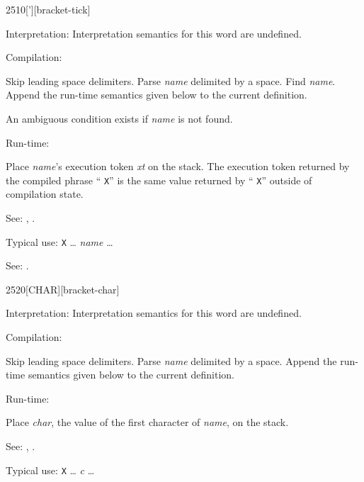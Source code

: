 \begin{newword*}{2510}{[']}[bracket-tick]
\item[Interpretation:]
	Interpretation semantics for this word are undefined.

\item[Compilation:]

	Skip leading space delimiters. Parse \emph{name} delimited by
	a space. Find \emph{name}. Append the run-time semantics given
	below to the current definition.

	An ambiguous condition exists if \emph{name} is not found.

\item[Run-time:]

	Place \emph{name}'s execution token \emph{xt} on the stack. The
	execution token returned by the compiled phrase
	``\word{[']} \texttt{X}'' is the same value returned by
	`` \texttt{X}'' outside of compilation state.

\item[See:]
	,
	.

	\begin{rationale} %
		Typical use:
			\word{:} \texttt{X} {\ldots}
				\word{[']} \emph{name}
			{\ldots} \word{;}

		See:
			.
	\end{rationale}
\end{newword*}


\begin{newword*}{2520}{[CHAR]}[bracket-char]
\item[Interpretation:]
	Interpretation semantics for this word are undefined.

\item[Compilation:]

	Skip leading space delimiters. Parse \emph{name} delimited by
	a space. Append the run-time semantics given below to the
	current definition.

\item[Run-time:]

	Place \emph{char}, the value of the first character of
	\emph{name}, on the stack.

\item[See:]
	,
	.

	\begin{rationale} %
		Typical use:
			\word{:} \texttt{X} {\ldots}
				\word{[CHAR]} \emph{c}
			{\ldots} \word{;}
	\end{rationale}
\end{newword*}


